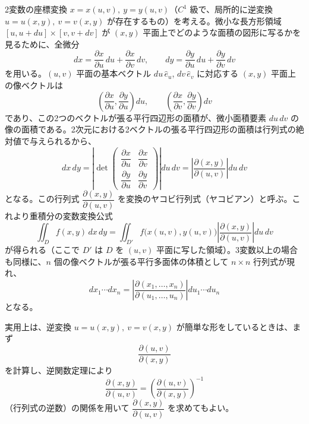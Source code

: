 \documentclass[a4paper,11pt]{article}
\begin{document}


\noindent
2変数の座標変換 $x = x(u,v),\ y = y(u,v)$（$C^{1}$ 級で、局所的に逆変換 $u = u(x,y),\ v = v(x,y)$ が存在するもの）を考える。微小な長方形領域 $[u, u+du] \times [v, v+dv]$ が $(x,y)$ 平面上でどのような面積の図形に写るかを見るために、全微分
\[
dx = \frac{\partial x}{\partial u}\, du + \frac{\partial x}{\partial v}\, dv, \qquad
dy = \frac{\partial y}{\partial u}\, du + \frac{\partial y}{\partial v}\, dv
\]
を用いる。$(u,v)$ 平面の基本ベクトル $du\,\hat{e}_u$, $dv\,\hat{e}_v$ に対応する $(x,y)$ 平面上の像ベクトルは
\[
\left(\frac{\partial x}{\partial u}, \frac{\partial y}{\partial u}\right) du, \qquad
\left(\frac{\partial x}{\partial v}, \frac{\partial y}{\partial v}\right) dv
\]
であり、この2つのベクトルが張る平行四辺形の面積が、微小面積要素 $du\, dv$ の像の面積である。2次元における2ベクトルの張る平行四辺形の面積は行列式の絶対値で与えられるから、
\[
dx\, dy = \left| \det \begin{pmatrix} \dfrac{\partial x}{\partial u} & \dfrac{\partial x}{\partial v} \\[2mm] \dfrac{\partial y}{\partial u} & \dfrac{\partial y}{\partial v} \end{pmatrix} \right| du\, dv
= \left| \frac{\partial(x,y)}{\partial(u,v)} \right| du\, dv
\]
となる。この行列式 $\dfrac{\partial(x,y)}{\partial(u,v)}$ を変換のヤコビ行列式（ヤコビアン）と呼ぶ。これより重積分の変数変換公式
\[
\iint_{D} f(x,y)\, dx\, dy = \iint_{D'} f\bigl(x(u,v), y(u,v)\bigr) \left| \frac{\partial(x,y)}{\partial(u,v)} \right| du\, dv
\]
が得られる（ここで $D'$ は $D$ を $(u,v)$ 平面に写した領域）。3変数以上の場合も同様に、$n$ 個の像ベクトルが張る平行多面体の体積として $n \times n$ 行列式が現れ、
\[
dx_{1}\cdots dx_{n} = \left| \frac{\partial(x_{1}, \ldots, x_{n})}{\partial(u_{1}, \ldots, u_{n})} \right| du_{1} \cdots du_{n}
\]
となる。

\medskip
\noindent
実用上は、逆変換 $u = u(x,y),\ v = v(x,y)$ が簡単な形をしているときは、まず
\[
\frac{\partial(u,v)}{\partial(x,y)}
\]
を計算し、逆関数定理により
\[
\frac{\partial(x,y)}{\partial(u,v)} = \left( \frac{\partial(u,v)}{\partial(x,y)} \right)^{-1}
\]
（行列式の逆数）の関係を用いて $\dfrac{\partial(x,y)}{\partial(u,v)}$ を求めてもよい。
\end{document}
